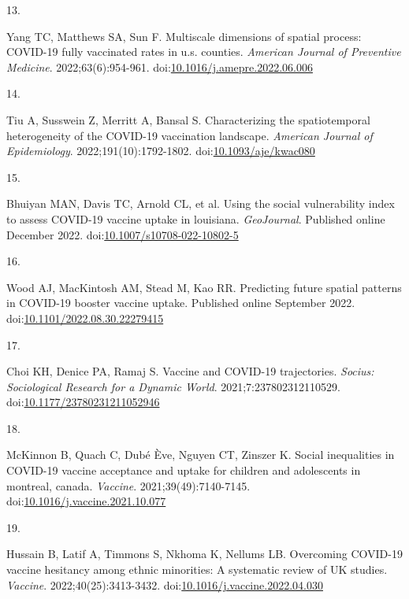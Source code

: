 \documentclass[
  letterpaper,
  DIV=11,
  numbers=noendperiod]{scrartcl}
\newlength{\cslhangindent}
\newlength{\csllabelwidth}
\newlength{\cslentryspacingunit} %
\newenvironment{CSLReferences}[2] %
 {%
  \setlength{\parindent}{0pt}
  \ifodd #1
  \let\oldpar\par
  \def\par{\hangindent=\cslhangindent\oldpar}
  \fi
  \setlength{\parskip}{#2\cslentryspacingunit}
 }%
 {}
\newcommand{\CSLLeftMargin}[1]{\parbox[t]{\csllabelwidth}{#1}}
\newcommand{\CSLRightInline}[1]{\parbox[t]{\linewidth - \csllabelwidth}{#1}\break}
\begin{document}
\begin{CSLReferences}{0}{0}
\leavevmode{}%
\CSLLeftMargin{13. }%
\CSLRightInline{Yang TC, Matthews SA, Sun F. Multiscale dimensions of
spatial process: {COVID}-19 fully vaccinated rates in u.s. counties.
\emph{American Journal of Preventive Medicine}. 2022;63(6):954-961.
doi:\href{https://doi.org/10.1016/j.amepre.2022.06.006}{10.1016/j.amepre.2022.06.006}}

\leavevmode{}%
\CSLLeftMargin{14. }%
\CSLRightInline{Tiu A, Susswein Z, Merritt A, Bansal S. Characterizing
the spatiotemporal heterogeneity of the {COVID}-19 vaccination
landscape. \emph{American Journal of Epidemiology}.
2022;191(10):1792-1802.
doi:\href{https://doi.org/10.1093/aje/kwac080}{10.1093/aje/kwac080}}

\leavevmode{}%
\CSLLeftMargin{15. }%
\CSLRightInline{Bhuiyan MAN, Davis TC, Arnold CL, et al. Using the
social vulnerability index to assess {COVID}-19 vaccine uptake in
louisiana. \emph{{GeoJournal}}. Published online December 2022.
doi:\href{https://doi.org/10.1007/s10708-022-10802-5}{10.1007/s10708-022-10802-5}}

\leavevmode{}%
\CSLLeftMargin{16. }%
\CSLRightInline{Wood AJ, MacKintosh AM, Stead M, Kao RR. Predicting
future spatial patterns in {COVID}-19 booster vaccine uptake. Published
online September 2022.
doi:\href{https://doi.org/10.1101/2022.08.30.22279415}{10.1101/2022.08.30.22279415}}

\leavevmode{}%
\CSLLeftMargin{17. }%
\CSLRightInline{Choi KH, Denice PA, Ramaj S. Vaccine and {COVID}-19
trajectories. \emph{Socius: Sociological Research for a Dynamic World}.
2021;7:237802312110529.
doi:\href{https://doi.org/10.1177/23780231211052946}{10.1177/23780231211052946}}

\leavevmode{}%
\CSLLeftMargin{18. }%
\CSLRightInline{McKinnon B, Quach C, Dubé Ève, Nguyen CT, Zinszer K.
Social inequalities in {COVID}-19 vaccine acceptance and uptake for
children and adolescents in montreal, canada. \emph{Vaccine}.
2021;39(49):7140-7145.
doi:\href{https://doi.org/10.1016/j.vaccine.2021.10.077}{10.1016/j.vaccine.2021.10.077}}

\leavevmode{}%
\CSLLeftMargin{19. }%
\CSLRightInline{Hussain B, Latif A, Timmons S, Nkhoma K, Nellums LB.
Overcoming {COVID}-19 vaccine hesitancy among ethnic minorities: A
systematic review of {UK} studies. \emph{Vaccine}.
2022;40(25):3413-3432.
doi:\href{https://doi.org/10.1016/j.vaccine.2022.04.030}{10.1016/j.vaccine.2022.04.030}}


\end{CSLReferences}
\end{document}
